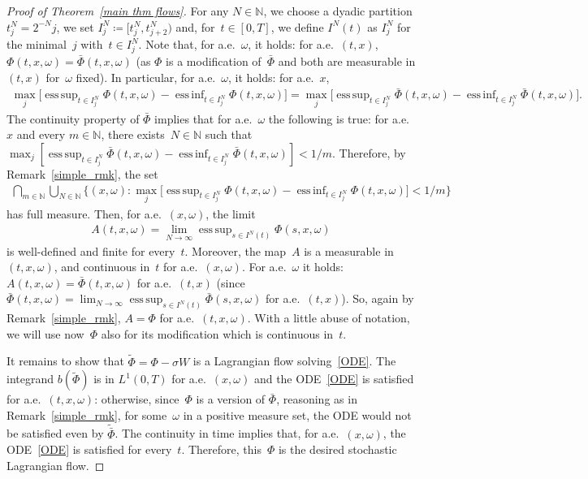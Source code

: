 \documentclass[a4paper,10pt]{article}
\newcommand\1{\mathbbm{1}}
\newcommand{\td}{\tilde}
\DeclareMathOperator*{\esssup}{ess\,sup}
\DeclareMathOperator*{\essinf}{ess\,inf}
\numberwithin{equation}{section}
\begin{document}
\begin{proof}[Proof of Theorem~\ref{main thm flows}]
For any $N \in \mathbb{N}$, we choose a dyadic partition $t^N_j=2^{-N}j$, we set $I^N_j \coloneqq [t^N_j,t^N_{j+2})$ and, for~$t \in [0,T]$, we define $I^N(t)$ as $I^N_j$ for the minimal~$j$ with~$t \in I^N_j$. Note that, for a.e.~$\omega$, it holds: for a.e.~$(t,x)$, $\Phi(t,x,\omega)=\bar{\Phi}(t,x,\omega)$ (as $\Phi$ is a modification of~$\bar{\Phi}$ and both are measurable in $(t,x)$ for~$\omega$ fixed). In particular, for a.e.~$\omega$, it holds: for a.e.~$x$,
\begin{align*}
\max_j \big[\esssup_{t\in I^N_j}\Phi(t,x,\omega) - \essinf_{t\in I^N_j}\Phi(t,x,\omega)\big] = \max_j\big[\esssup_{t\in I^N_j}\bar{\Phi}(t,x,\omega) - \essinf_{t\in I^N_j}\bar{\Phi}(t,x,\omega)\big].
\end{align*}
The continuity property of $\bar{\Phi}$ implies that for a.e.~$\omega$ the following is true: for a.e.~$x$ and every $m \in \mathbb{N}$, there exists~$N\in \mathbb{N}$ such that $\max_j[\esssup_{t\in I^N_j}\bar{\Phi}(t,x,\omega) - \essinf_{t\in I^N_j}\bar{\Phi}(t,x,\omega)]<1/m$. Therefore, by Remark~\ref{simple_rmk}, the set
\begin{align*}
\bigcap_{m \in \mathbb{N}} \bigcup_{N \in \mathbb{N}} \big\{(x,\omega) \colon \max_j \big[\esssup_{t\in I^N_j}\Phi(t,x,\omega) - \essinf_{t\in I^N_j}\Phi(t,x,\omega)\big] < 1/m \big\}
\end{align*}
has full measure. Then, for a.e.~$(x,\omega)$, the limit
\begin{align*}
A(t,x,\omega)=\lim_{N \to \infty} \esssup_{s\in I^N(t)}\Phi(s,x,\omega)\end{align*}
is well-defined and finite for every~$t$. Moreover, the map~$A$ is a measurable in $(t,x,\omega)$, and continuous in~$t$ for a.e.~$(x,\omega)$. For a.e.~$\omega$ it holds: $A(t,x,\omega)=\bar{\Phi}(t,x,\omega)$ for a.e.~$(t,x)$ (since $\bar{\Phi}(t,x,\omega)=\lim_{N \to \infty} \esssup_{s\in I^N(t)}\bar{\Phi}(s,x,\omega)$ for a.e.~$(t,x)$). So, again by Remark~\ref{simple_rmk}, $A=\Phi$ for a.e.~$(t,x,\omega)$. With a little abuse of notation, we will use now~$\Phi$ also for its modification which is continuous in~$t$.

It remains to show that $\td{\Phi} = \Phi-\sigma W$ is a Lagrangian flow solving~\eqref{ODE}. The integrand $b(\td{\Phi})$ is in $L^1(0,T)$ for a.e.~$(x,\omega)$ and the ODE~\eqref{ODE} is satisfied for a.e.~$(t,x,\omega)$: otherwise, since~$\Phi$ is a version of $\bar{\Phi}$, reasoning as in Remark~\ref{simple_rmk}, for some~$\omega$ in a positive measure set, the ODE would not be satisfied even by $\td{\bar{\Phi}}$. The continuity in time implies that, for a.e.~$(x,\omega)$, the ODE~\eqref{ODE} is satisfied for every~$t$. Therefore, this~$\Phi$ is the desired stochastic Lagrangian flow. 


\end{proof}
\end{document}
